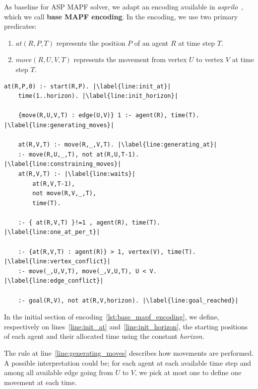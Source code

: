 As baseline for ASP MAPF solver, we adapt an encoding available in  \textit{asprilo}~\cite{geobotscsangso18a}, which we call \textbf{base MAPF encoding}. In the encoding, we use two primary predicates:

\begin{enumerate}\label{list:base_mapf_encoding_predicate_explanation}
    \item \(at(R,P,T)\)  represents the position \(P\) of an agent \(R\) at time step \(T\).
    \item \(move(R,U,V,T)\) represents the movement from vertex \(U\) to vertex \(V\) at time step \(T\).
\end{enumerate}

\begin{minipage}[H]{\linewidth}
\begin{lstlisting}[style=mystyle, caption={Base MAPF encoding}, label={lst:base_mapf_encoding}]
    at(R,P,0) :- start(R,P). |\label{line:init_at}|
    time(1..horizon). |\label{line:init_horizon}|

    {move(R,U,V,T) : edge(U,V)} 1 :- agent(R), time(T). |\label{line:generating_moves}|

    at(R,V,T) :- move(R,_,V,T). |\label{line:generating_at}|
    :- move(R,U,_,T), not at(R,U,T-1). |\label{line:constraining_moves}|
    at(R,V,T) :- |\label{line:waits}|
        at(R,V,T-1), 
        not move(R,V,_,T), 
        time(T). 

    :- { at(R,V,T) }!=1 , agent(R), time(T). |\label{line:one_at_per_t}|

    :- {at(R,V,T) : agent(R)} > 1, vertex(V), time(T). |\label{line:vertex_conflict}|
    :- move(_,U,V,T), move(_,V,U,T), U < V. |\label{line:edge_conflict}|
        
    :- goal(R,V), not at(R,V,horizon). |\label{line:goal_reached}|
\end{lstlisting}
\end{minipage}

In the initial section of encoding~\ref{lst:base_mapf_encoding}, we define, respectively on lines~\ref{line:init_at} and~\ref{line:init_horizon}, the starting positions of each agent and their allocated time using the constant \textit{horizon}.


The rule at line~\ref{line:generating_moves} describes how movements are performed. A possible interpretation could be; for each agent at each available time step and among all available edge going from \(U\) to \(V\), we pick at most one to define one movement at each time.

